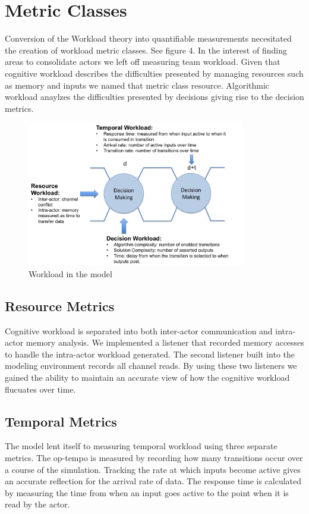 \section{Metric Classes}
Conversion of the Workload theory into quantifiable measurements necesitated the creation of workload metric classes. See figure 4. In the interest of finding areas to consolidate actors we left off measuring team workload. Given that cognitive workload describes the difficulties presented by managing resources such as memory and inputs we named that metric class resource. Algorithmic workload anaylzes the difficulties presented by decisions giving rise to the decision metrics.


\begin{figure}[h]
\center
\setlength{\abovecaptionskip}{1mm}
\setlength{\belowcaptionskip}{1mm}
\setlength{\textfloatsep}{1mm}
\setlength{\floatsep}{1mm}
\includegraphics[height=2.5in]{WorkloadMetrics.png}
\caption{Workload in the model}
\label{fig:WorkloadMetrics}
\end{figure}

\subsection{Resource Metrics}
Cognitive workload is separated into both inter-actor communication and intra-actor memory analysis. We implemented a listener that recorded memory accesses to handle the intra-actor workload generated. The second listener built into the modeling environment records all channel reads. By using these two listeners we gained the ability to maintain an accurate view of how the cognitive workload flucuates over time.

\subsection{Temporal Metrics}
The model lent itself to measuring temporal workload using three separate metrics. The op-tempo is measured by recording how many transitions occur over a course of the simulation. Tracking the rate at which inputs become active gives an accurate reflection for the arrival rate of data. The response time is calculated by measuring the time from when an input goes active to the point when it is read by the actor.

